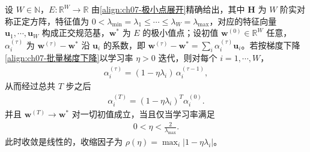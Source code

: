 \documentclass[../../main.tex]{subfiles}
\begin{document}
\begin{theorem}[二次近似下的线性收敛]\label{theorem:ch07-线性收敛}
设 $W\in\mathbb{N}$，$E:\mathbb{R}^{W}\to\mathbb{R}$ 由\eqref{align:ch07-极小点展开}精确给出，其中 $\mathbf{H}$ 为 $W$ 阶实对称正定方阵，特征值为 $0<\lambda_{\min}=\lambda_1\leqslant\cdots\leqslant\lambda_W=\lambda_{\max}$，对应的特征向量 $\mathbf{u}_1,\cdots,\mathbf{u}_W$ 构成正交规范基，$\mathbf{w}^{\ast}$ 为 $E$ 的极小值点；设初值 $\mathbf{w}^{(0)}\in\mathbb{R}^{W}$ 任意，$\alpha_i^{(\tau)}$ 为 $\mathbf{w}^{(\tau)}-\mathbf{w}^{\ast}$ 沿 $\mathbf{u}_i$ 的系数，即 $\mathbf{w}^{(\tau)}-\mathbf{w}^{\ast}=\sum_i\alpha_i^{(\tau)}\mathbf{u}_i$。若按梯度下降\eqref{align:ch07-批量梯度下降}以学习率 $\eta>0$ 迭代，则对每个 $i=1,\cdots,W$，
\begin{align}
\alpha_i^{(\tau)} = (1-\eta\lambda_i)\,\alpha_i^{(\tau-1)},
\label{align:ch07-alpha更新}
\end{align}
从而经过总共 $T$ 步之后
\begin{align}
\alpha_i^{(T)} = (1-\eta\lambda_i)^{T}\alpha_i^{(0)}.
\label{align:ch07-alpha-T}
\end{align}
并且 $\mathbf{w}^{(T)}\to\mathbf{w}^{\ast}$ 对一切初值成立，当且仅当学习率满足
\begin{align}
0<\eta<\frac{2}{\lambda_{\max}}.
\label{align:ch07-学习率上界}
\end{align}
此时收敛是线性的，收缩因子为 $\rho(\eta)=\max_i|1-\eta\lambda_i|$。
\end{theorem}
\end{document}
